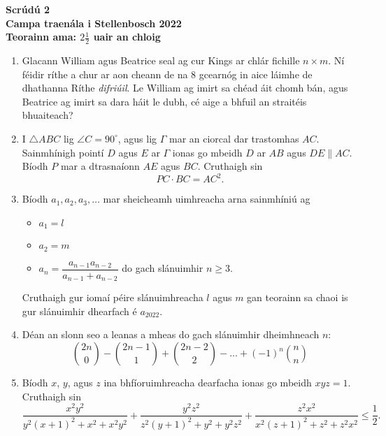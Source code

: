 \documentclass{article}
\begin{document}
\thispagestyle{empty}

\begin{center}
  \textbf{\Large Scrúdú 2}
  \\ \vspace{1em}
  \textbf{\large Campa traenála i Stellenbosch 2022}
  \\ \vspace{1em}
  \textbf{\large Teorainn ama: $2\frac{1}{2}$ uair an chloig}
\end{center}

\bigskip

\vfill

\begin{enumerate}[itemsep=\fill]

\item %
Glacann William agus Beatrice seal ag cur Kings ar chlár fichille $n \times m$.
Ní féidir ríthe a chur ar aon cheann de na 8 gcearnóg in aice láimhe de dhathanna Ríthe \emph{difriúil}.
Le William ag imirt sa chéad áit chomh bán, agus Beatrice ag imirt sa dara háit le dubh, cé aige a bhfuil an straitéis bhuaiteach?


\item %
I $\triangle ABC$ lig $\angle C = 90^\circ$, agus lig $\Gamma$ mar an ciorcal dar trastomhas $AC$.
Sainmhínigh pointí $D$ agus $E$ ar $\Gamma$ ionas go mbeidh $D$ ar $AB$ agus $DE \parallel AC$.
Bíodh $P$ mar a dtrasnaíonn $AE$ agus $BC$.
Cruthaigh sin
\[ PC \cdot BC = AC^2. \]


\vspace{0pt}
\item %
Bíodh $a_1, a_2, a_3, \dots$ mar sheicheamh uimhreacha arna sainmhíniú ag
\begin{itemize}
    \item $a_1 = l$
    \item $a_2 = m$
    \item $a_n = \dfrac{a_{n-1}a_{n-2}}{a_{n-1}+a_{n-2}}$ do gach slánuimhir $n \geq 3$.
\end{itemize}
Cruthaigh gur iomaí péire slánuimhreacha $l$ agus $m$ gan teorainn sa chaoi is gur slánuimhir dhearfach é $a_{2022}$.


\item %
Déan an slonn seo a leanas a mheas do gach slánuimhir dheimhneach $n$:
\[ {2n \choose 0} -{2n-1 \choose 1}+{2n-2 \choose 2}-...+(-1)^n{n\choose n} \]


\vspace{0pt}
\item %
Bíodh $x$, $y$, agus $z$ ina bhfíoruimhreacha dearfacha ionas go mbeidh $xyz = 1$.
Cruthaigh sin
\[ \frac{x^2y^2}{y^2(x+1)^2+x^2+x^2y^2} +\frac{y^2z^2}{z^2(y+1)^2+y^2+y^2z^2} +\frac{z^2x^2}{x^2(z+1)^2+z^2+z^2x^2} \leq \frac{1}{2}. \]

\end{enumerate}
\end{document}
